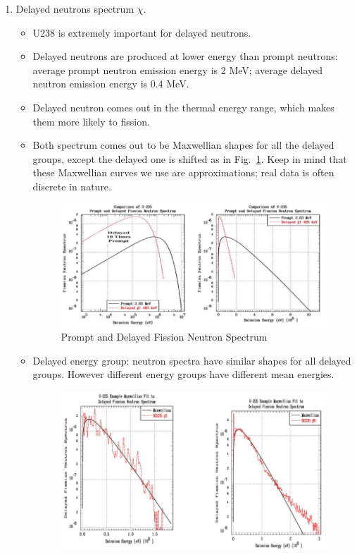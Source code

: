 \documentclass{school-22.211-notes}
\begin{document}
\begin{enumerate}
\begin{itemize}
\begin{table}[ht]
      \caption{8-group Fixed Decay Constans for All Species} \label{8-group-data}
    \end{table}
  \end{itemize}


\item Delayed neutrons spectrum $\chi$.
  \begin{itemize}
  \item U238 is extremely important for delayed neutrons.
  \item Delayed neutrons are produced at lower energy than prompt neutrons: average prompt neutron emission energy is 2 MeV; average delayed neutron emission energy is 0.4 MeV. 
  \item Delayed neutron comes out in the thermal energy range, which makes them more likely to fission. 
  \item Both spectrum comes out to be Maxwellian shapes for all the delayed groups, except the delayed one is shifted as in Fig.~\ref{fission-spec}. Keep in mind that these Maxwellian curves we use are approximations; real data is often discrete in nature. 
    \begin{figure}[ht]
      \centering
      \includegraphics[width=4in]{images/pke/fission-spec.png}
      \caption{Prompt and Delayed Fission Neutron Spectrum} \label{fission-spec}
    \end{figure}
  \item Delayed energy group: neutron spectra have similar shapes for all delayed groups. However different energy groups have different mean energies. 
    \begin{figure}[ht]
      \centering
      \includegraphics[width=4in]{images/pke/delayed-fission-spec.png}

\end{figure}
\end{itemize}
\end{enumerate}
\end{document}
